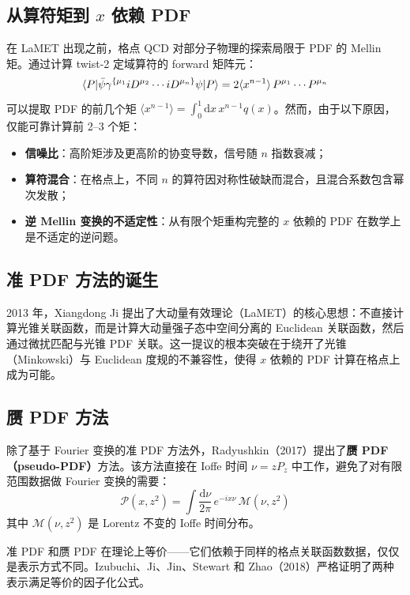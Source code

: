 \documentclass[11pt,a4paper]{ctexart}
\begin{document}
\subsection{从算符矩到 $x$ 依赖 PDF}

在 LaMET 出现之前，格点 QCD 对部分子物理的探索局限于 PDF 的 Mellin 矩。通过计算 twist-2 定域算符的 forward 矩阵元：
\begin{equation}
\braket{P | \bar{\psi} \gamma^{\{\mu_1} i D^{\mu_2} \cdots i D^{\mu_n\}} \psi | P}
= 2 \langle x^{n-1} \rangle \, P^{\mu_1} \cdots P^{\mu_n}
\end{equation}
可以提取 PDF 的前几个矩 $\langle x^{n-1} \rangle = \int_0^1 \mathrm{d}x \, x^{n-1} q(x)$。然而，由于以下原因，仅能可靠计算前 2--3 个矩：
\begin{itemize}
  \item \textbf{信噪比}：高阶矩涉及更高阶的协变导数，信号随 $n$ 指数衰减；
  \item \textbf{算符混合}：在格点上，不同 $n$ 的算符因对称性破缺而混合，且混合系数包含幂次发散；
  \item \textbf{逆 Mellin 变换的不适定性}：从有限个矩重构完整的 $x$ 依赖的 PDF 在数学上是不适定的逆问题。
\end{itemize}

\subsection{准 PDF 方法的诞生}

2013 年，Xiangdong Ji 提出了大动量有效理论（LaMET）的核心思想：不直接计算光锥关联函数，而是计算大动量强子态中空间分离的 Euclidean 关联函数，然后通过微扰匹配与光锥 PDF 关联。这一提议的根本突破在于绕开了光锥（Minkowski）与 Euclidean 度规的不兼容性，使得 $x$ 依赖的 PDF 计算在格点上成为可能。

\subsection{赝 PDF 方法}

除了基于 Fourier 变换的准 PDF 方法外，Radyushkin（2017）提出了\textbf{赝 PDF（pseudo-PDF）}方法。该方法直接在 Ioffe 时间 $\nu = z P_z$ 中工作，避免了对有限范围数据做 Fourier 变换的需要：
\begin{equation}
\mathcal{P}(x, z^2) = \int \frac{\mathrm{d}\nu}{2\pi} \, e^{-i x \nu} \,
\mathcal{M}(\nu, z^2)
\end{equation}
其中 $\mathcal{M}(\nu, z^2)$ 是 Lorentz 不变的 Ioffe 时间分布。

准 PDF 和赝 PDF 在理论上等价——它们依赖于同样的格点关联函数数据，仅仅是表示方式不同。Izubuchi、Ji、Jin、Stewart 和 Zhao（2018）严格证明了两种表示满足等价的因子化公式。
\end{document}
